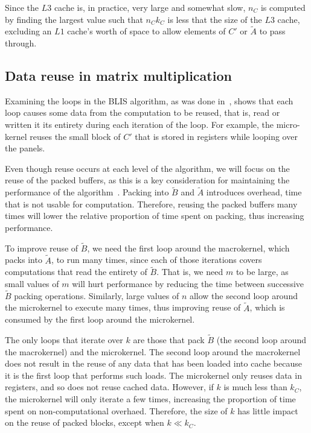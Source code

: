 \documentclass[12pt]{article}
\newcommand*{\mycite}[1]{~\cite{#1}}
\begin{document}
Since the $L3$ cache is, in practice, very large and somewhat slow, $n_C$ is computed by finding the largest value such that $n_Ck_C$ is less that the size of the $L3$ cache, excluding an $L1$ cache's worth of space to allow elements of $C'$ or $\widetilde{A}$ to pass through.

\subsection{Data reuse in  matrix multiplication}
Examining the loops in the BLIS algorithm, as was done in\mycite{Low2016}, shows that each loop causes some data from the computation to be reused, that is, read or written it its entirety during each iteration of the loop.
For example, the micro-kernel reuses the small block of $C'$ that is stored in registers while looping over the panels.

Even though reuse occurs at each level of the algorithm, we will focus on the reuse of the packed buffers, as this is a key consideration for maintaining the performance of the algorithm\mycite{Henry92}.
Packing into $\widetilde{B}$ and $\widetilde{A}$ introduces overhead, time that is not usable for computation.
Therefore, reusing the packed buffers many times will lower the relative proportion of time spent on packing, thus increasing performance.

To improve reuse of $\widetilde{B}$, we need the first loop around the macrokernel, which packs into $\widetilde{A}$, to run many times, since each of those iterations covers computations that read the entirety of $\widetilde{B}$.
That is, we need $m$ to be large, as small values of $m$ will hurt performance by reducing the time between successive $\widetilde{B}$ packing operations.
Similarly, large values of $n$ allow the second loop around the microkernel to execute many times, thus improving reuse of $\widetilde{A}$, which is consumed by the first loop around the microkernel.

The only loops that iterate over $k$ are those that pack $\widetilde{B}$ (the second loop around the macrokernel) and the microkernel.
The second loop around the macrokernel does not result in the reuse of any data that has been loaded into cache because it is the first loop that performs such loads.
The microkernel only reuses data in registers, and so does not reuse cached data.
However, if $k$ is much less than $k_C$, the microkernel will only iterate a few times, increasing the proportion of time spent on non-computational overhaed.
Therefore, the size of $k$ has little impact on the reuse of packed blocks, except when $k \ll k_C$.
\end{document}
